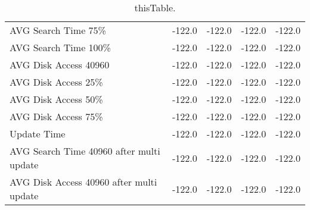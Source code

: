 \begin{table}
\begin{tabular}{ p{5cm} || R{2cm} | R{2cm} | R{2cm} | R{2cm} }
    AVG Search Time 75\% & -122.0 & -122.0 & -122.0 & -122.0 \\
    AVG Search Time 100\% & -122.0 & -122.0 & -122.0 & -122.0 \\
    AVG Disk Access 40960 & -122.0 & -122.0 & -122.0 & -122.0 \\
    AVG Disk Access 25\% & -122.0 & -122.0 & -122.0 & -122.0 \\
    AVG Disk Access 50\% & -122.0 & -122.0 & -122.0 & -122.0 \\
    AVG Disk Access 75\% & -122.0 & -122.0 & -122.0 & -122.0 \\
    Update Time & -122.0 & -122.0 & -122.0 & -122.0 \\
    AVG Search Time 40960 after multi update & -122.0 & -122.0 & -122.0 & -122.0 \\
    AVG Disk Access 40960 after multi update & -122.0 & -122.0 & -122.0 & -122.0 \\
    \bottomrule
    \end{tabular}
    \caption{thisTable.}
    \label{tab:thisTable}
\end{table}